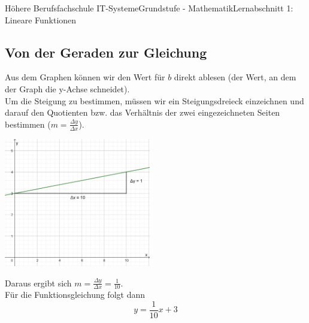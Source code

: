 \documentclass[11pt,twocolumn,oneside,openany,headings=optiontotoc,11pt,numbers=noenddot]{article}
\begin{document}
\begin{worksheet}{Höhere Berufsfachschule IT-Systeme}{Grundstufe - 
		Mathematik}{Lernabschnitt 1: Lineare Funktionen}
		\subsection{Von der Geraden zur Gleichung}
		Aus dem Graphen können wir den Wert für \(b\) direkt ablesen (der Wert, an dem der Graph die y-Achse schneidet).\\
		Um die Steigung zu bestimmen, müssen wir ein Steigungsdreieck einzeichnen und darauf den Quotienten bzw. das Verhältnis der zwei eingezeichneten Seiten bestimmen (\(m = \frac{\Delta{}y}{\Delta{}x}\)).\\
		\par\noindent
		\includegraphics[width=0.48\textwidth]{../99_Bilder/GzF.png}\\
		\par\noindent
		Daraus ergibt sich \(m = \frac{\Delta{}y}{\Delta{}x} = \frac{1}{10}\).\\
		Für die Funktionsgleichung folgt dann
		\[y = \frac{1}{10}x + 3\]

\end{worksheet}
\end{document}
